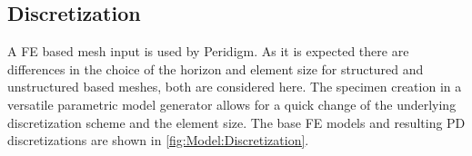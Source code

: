 \subsection{Discretization}

A FE based mesh input is used by Peridigm. As it is expected there are differences in the choice of the horizon and element size for structured and unstructured based meshes, both are considered here. The specimen creation in a versatile parametric model generator allows for a quick change of the underlying discretization scheme and the element size. The base FE models and resulting PD discretizations are shown in \autoref{fig:Model:Discretization}.




